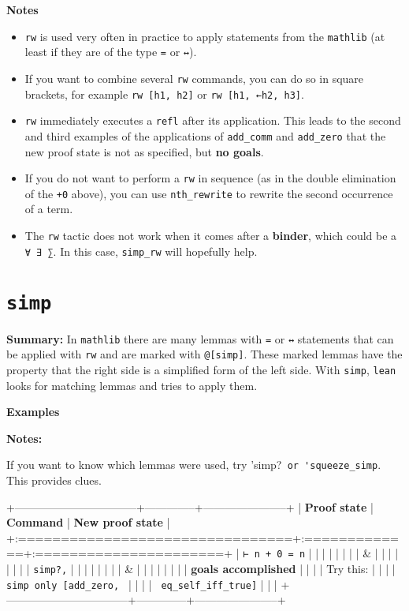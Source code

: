 \documentclass{memoir}
\begin{document}
\textbf{Notes}

\begin{itemize}
\item \Verb|rw| is used very often in practice to apply statements from the \Verb|mathlib| (at least if they are of the type \Verb|=| or \Verb|↔|).\item If you want to combine several \Verb|rw| commands, you can do so in square brackets, for example \Verb|rw [h1, h2]| or \Verb|rw [h1, ←h2, h3]|.\item \Verb|rw| immediately executes a \Verb|refl| after its application. This leads to the second and third examples of the applications of \Verb|add_comm| and \Verb|add_zero| that the new proof state is not as specified, but \textbf{no goals}.\item If you do not want to perform a \Verb|rw| in sequence (as in the double elimination of the \Verb|+0| above), you can use \Verb|nth_rewrite| to rewrite the second occurrence of a term.\item The \Verb|rw| tactic does not work when it comes after a \textbf{binder}, which could be a \Verb|∀ ∃ ∑|. In this case, \Verb|simp_rw| will hopefully help.

\end{itemize}




\section{\Verb|simp|}

\textbf{Summary:} In \Verb|mathlib| there are many lemmas with \Verb|=| or \Verb|↔| statements that can be applied with \Verb|rw| and are marked with \Verb|@[simp]|. These marked lemmas have the property that the right side is a simplified form of the left side. With \Verb|simp|, \Verb|lean| looks for matching lemmas and tries to apply them.

\textbf{Examples}

\textbf{Notes:}

If you want to know which lemmas were used, try 'simp?\Verb| or 'squeeze_simp|. This provides clues.

+---------------------------------+--------------+-----------------------+
| \textbf{Proof state} | \textbf{Command} | \textbf{New proof state} |
+:================================+:=============+:======================+
| \Verb|⊢ n + 0 = n| | | |
| | | |
| & | | |
| | | |
| \Verb|simp?,| | | |
| | | |
| & | | |
| | | |
| \textbf{goals accomplished} | | |
| Try this: | | |
| \Verb|simp only [add_zero, | | | |
| \Verb| eq_self_iff_true]| | | |
+---------------------------------+--------------+-----------------------+
\end{document}
